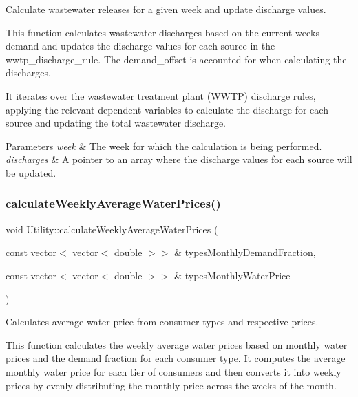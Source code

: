 Calculate wastewater releases for a given week and update discharge values. 

This function calculates wastewater discharges based on the current week\textquotesingle{}s demand and updates the discharge values for each source in the wwtp\+\_\+discharge\+\_\+rule. The demand\+\_\+offset is accounted for when calculating the discharges.

It iterates over the wastewater treatment plant (W\+W\+TP) discharge rules, applying the relevant dependent variables to calculate the discharge for each source and updating the total wastewater discharge.


\begin{DoxyParams}{Parameters}
{\em week} & The week for which the calculation is being performed. \\
\hline
{\em discharges} & A pointer to an array where the discharge values for each source will be updated. \\
\hline
\end{DoxyParams}
\mbox{\label{classUtility_a0189edb631c9596f094b15afeeb934fd}} 
\subsubsection{\texorpdfstring{calculate\+Weekly\+Average\+Water\+Prices()}{calculateWeeklyAverageWaterPrices()}}
{\footnotesize\ttfamily void Utility\+::calculate\+Weekly\+Average\+Water\+Prices (\begin{DoxyParamCaption}\item[{const vector$<$ vector$<$ double $>$$>$ \&}]{types\+Monthly\+Demand\+Fraction,  }\item[{const vector$<$ vector$<$ double $>$$>$ \&}]{types\+Monthly\+Water\+Price }\end{DoxyParamCaption})}



Calculates average water price from consumer types and respective prices. 

This function calculates the weekly average water prices based on monthly water prices and the demand fraction for each consumer type. It computes the average monthly water price for each tier of consumers and then converts it into weekly prices by evenly distributing the monthly price across the weeks of the month.


